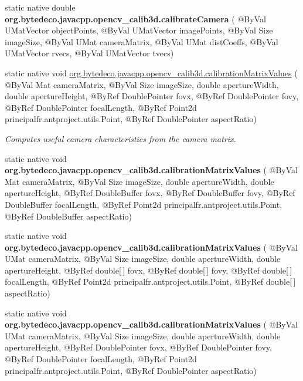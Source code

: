 \begin{DoxyCompactItemize}
static native double {\bfseries org.\+bytedeco.\+javacpp.\+opencv\+\_\+calib3d.\+calibrate\+Camera} ( @By\+Val U\+Mat\+Vector object\+Points, @By\+Val U\+Mat\+Vector image\+Points, @By\+Val Size image\+Size, @By\+Val U\+Mat camera\+Matrix, @By\+Val U\+Mat dist\+Coeffs, @By\+Val U\+Mat\+Vector rvecs, @By\+Val U\+Mat\+Vector tvecs)
\item 
static native void \hyperlink{group__calib3d_ga35bea5b10b8dfd23238f72e9a2e2ac27}{org.\+bytedeco.\+javacpp.\+opencv\+\_\+calib3d.\+calibration\+Matrix\+Values} ( @By\+Val Mat camera\+Matrix, @By\+Val Size image\+Size, double aperture\+Width, double aperture\+Height, @By\+Ref Double\+Pointer fovx, @By\+Ref Double\+Pointer fovy, @By\+Ref Double\+Pointer focal\+Length, @By\+Ref Point2d principal\+fr.antproject.utils.Point, @By\+Ref Double\+Pointer aspect\+Ratio)
\begin{DoxyCompactList}\small\item\em Computes useful camera characteristics from the camera matrix. \end{DoxyCompactList}\item 
\mbox{\label{group__calib3d_ga965805632830d6c180c894a5e9c1a1c6}} 
static native void {\bfseries org.\+bytedeco.\+javacpp.\+opencv\+\_\+calib3d.\+calibration\+Matrix\+Values} ( @By\+Val Mat camera\+Matrix, @By\+Val Size image\+Size, double aperture\+Width, double aperture\+Height, @By\+Ref Double\+Buffer fovx, @By\+Ref Double\+Buffer fovy, @By\+Ref Double\+Buffer focal\+Length, @By\+Ref Point2d principal\+fr.antproject.utils.Point, @By\+Ref Double\+Buffer aspect\+Ratio)
\item 
\mbox{\label{group__calib3d_ga3624140df267680d7e2d3272dce97372}} 
static native void {\bfseries org.\+bytedeco.\+javacpp.\+opencv\+\_\+calib3d.\+calibration\+Matrix\+Values} ( @By\+Val U\+Mat camera\+Matrix, @By\+Val Size image\+Size, double aperture\+Width, double aperture\+Height, @By\+Ref double\mbox{[}$\,$\mbox{]} fovx, @By\+Ref double\mbox{[}$\,$\mbox{]} fovy, @By\+Ref double\mbox{[}$\,$\mbox{]} focal\+Length, @By\+Ref Point2d principal\+fr.antproject.utils.Point, @By\+Ref double\mbox{[}$\,$\mbox{]} aspect\+Ratio)
\item 
\mbox{\label{group__calib3d_gaa693381b532e9d003b629baa4f01a0fa}} 
static native void {\bfseries org.\+bytedeco.\+javacpp.\+opencv\+\_\+calib3d.\+calibration\+Matrix\+Values} ( @By\+Val U\+Mat camera\+Matrix, @By\+Val Size image\+Size, double aperture\+Width, double aperture\+Height, @By\+Ref Double\+Pointer fovx, @By\+Ref Double\+Pointer fovy, @By\+Ref Double\+Pointer focal\+Length, @By\+Ref Point2d principal\+fr.antproject.utils.Point, @By\+Ref Double\+Pointer aspect\+Ratio)

\end{DoxyCompactItemize}
